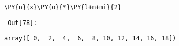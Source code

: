 {\par%
\vspace{-1\baselineskip}%
}%
\begin{notebookcell}[78]%
\begin{addmargin}[\cellleftmargin]{0em}%
{\smaller%
\par%
%
\vspace{-1\smallerfontscale}%
\begin{Verbatim}[commandchars=\\\{\}]
\PY{n}{x}\PY{o}{*}\PY{l+m+mi}{2}
\end{Verbatim}
%
\par%
\vspace{-1\smallerfontscale}}%
\end{addmargin}
\end{notebookcell}

\par\vspace{1\smallerfontscale}%
    
        {\par%
        \vspace{-1\smallerfontscale}%
        \noindent%
        \begin{minipage}{\cellleftmargin}%
    \hfill%
    {\smaller%
    \tt%
    \color{nbframe-out-prompt}%
    Out[78]:}%
    \hspace{\inputpadding}%
    \hspace{0em}%
    \hspace{3pt}%
    \end{minipage}%
        }%
    \begin{addmargin}[\cellleftmargin]{0em}%
    {\smaller%
    \vspace{-1\smallerfontscale}%
    
    
    
    \begin{verbatim}
array([ 0,  2,  4,  6,  8, 10, 12, 14, 16, 18])
    \end{verbatim}

    
}%
    \end{addmargin}%

